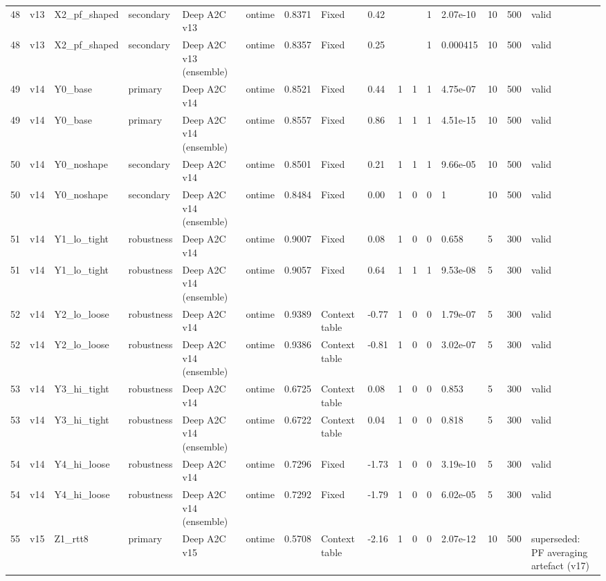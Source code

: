 \documentclass[10pt]{article}
\begin{document}
\begin{landscape}
\begin{longtable}{@{}llllllllllllllll@{}}
48 & v13 & X2\_pf\_shaped & secondary & Deep A2C v13 & ontime & 0.8371 & Fixed & 0.42 &  &  & 1 & 2.07e-10 & 10 & 500 & valid \\
48 & v13 & X2\_pf\_shaped & secondary & Deep A2C v13 (ensemble) & ontime & 0.8357 & Fixed & 0.25 &  &  & 1 & 0.000415 & 10 & 500 & valid \\
49 & v14 & Y0\_base & primary & Deep A2C v14 & ontime & 0.8521 & Fixed & 0.44 & 1 & 1 & 1 & 4.75e-07 & 10 & 500 & valid \\
49 & v14 & Y0\_base & primary & Deep A2C v14 (ensemble) & ontime & 0.8557 & Fixed & 0.86 & 1 & 1 & 1 & 4.51e-15 & 10 & 500 & valid \\
50 & v14 & Y0\_noshape & secondary & Deep A2C v14 & ontime & 0.8501 & Fixed & 0.21 & 1 & 1 & 1 & 9.66e-05 & 10 & 500 & valid \\
50 & v14 & Y0\_noshape & secondary & Deep A2C v14 (ensemble) & ontime & 0.8484 & Fixed & 0.00 & 1 & 0 & 0 & 1 & 10 & 500 & valid \\
51 & v14 & Y1\_lo\_tight & robustness & Deep A2C v14 & ontime & 0.9007 & Fixed & 0.08 & 1 & 0 & 0 & 0.658 & 5 & 300 & valid \\
51 & v14 & Y1\_lo\_tight & robustness & Deep A2C v14 (ensemble) & ontime & 0.9057 & Fixed & 0.64 & 1 & 1 & 1 & 9.53e-08 & 5 & 300 & valid \\
52 & v14 & Y2\_lo\_loose & robustness & Deep A2C v14 & ontime & 0.9389 & Context table & -0.77 & 1 & 0 & 0 & 1.79e-07 & 5 & 300 & valid \\
52 & v14 & Y2\_lo\_loose & robustness & Deep A2C v14 (ensemble) & ontime & 0.9386 & Context table & -0.81 & 1 & 0 & 0 & 3.02e-07 & 5 & 300 & valid \\
53 & v14 & Y3\_hi\_tight & robustness & Deep A2C v14 & ontime & 0.6725 & Context table & 0.08 & 1 & 0 & 0 & 0.853 & 5 & 300 & valid \\
53 & v14 & Y3\_hi\_tight & robustness & Deep A2C v14 (ensemble) & ontime & 0.6722 & Context table & 0.04 & 1 & 0 & 0 & 0.818 & 5 & 300 & valid \\
54 & v14 & Y4\_hi\_loose & robustness & Deep A2C v14 & ontime & 0.7296 & Fixed & -1.73 & 1 & 0 & 0 & 3.19e-10 & 5 & 300 & valid \\
54 & v14 & Y4\_hi\_loose & robustness & Deep A2C v14 (ensemble) & ontime & 0.7292 & Fixed & -1.79 & 1 & 0 & 0 & 6.02e-05 & 5 & 300 & valid \\
55 & v15 & Z1\_rtt8 & primary & Deep A2C v15 & ontime & 0.5708 & Context table & -2.16 & 1 & 0 & 0 & 2.07e-12 & 10 & 500 & superseded: PF averaging artefact (v17) \\

\end{longtable}
\end{landscape}
\end{document}
